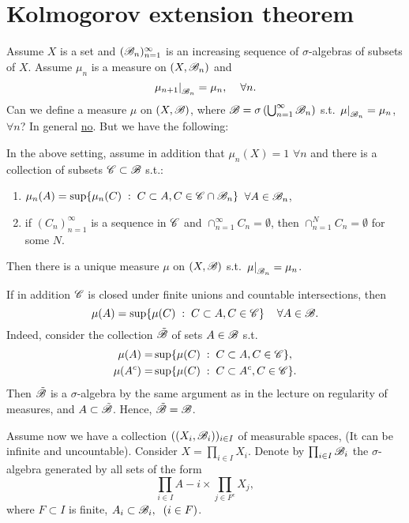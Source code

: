 \section{Kolmogorov extension theorem}
Assume $X$ is a set and $(\mathscr{B}_n)_{n=1}^\infty$ is an increasing sequence of $\sigma$-algebras of subsets of $X$. Assume $\mu_n$ is a measure on $(X,\mathscr{B}_n)$ and 
\[\left. \mu_{n+1} \right|_{\mathscr{B}_n}=\mu_n,\hspace{4mm}\forall n.\]
Can we define a measure $\mu$ on $(X,\mathscr{B})$, where $\mathscr{B}=\sigma\left(\bigcup_{n=1}^\infty \mathscr{B}_n\right)$ s.t. $\left.\mu\right|_{\mathscr{B}_n}=\mu_n$, $\forall n$?
In general \underline{no}. But we have the following:

\begin{theorem}

    In the above setting, assume in addition that $\mu_n(X)=1$ $\forall n$ and there is a collection of subsets $\mathscr{C}\subset \mathscr{B}$ s.t.:
    \begin{enumerate}
        \item $\mu_n(A)=\sup\{\mu_n(C)\hspace{1mm}: \hspace{1mm} C\subset A, C\in \mathscr{C}\cap \mathscr{B}_n \}$ $\forall A\in \mathscr{B}_n$,
        \item if $(C_n)_{n=1}^\infty$ is a sequence in $\mathscr{C}$ and $\cap_{n=1}^\infty C_n=\emptyset$, then $\cap_{n=1}^N C_n =\emptyset$ for some $N$.
    \end{enumerate}
    Then there is a unique measure $\mu$ on $(X,\mathscr{B})$ s.t. $\left.\mu\right|_{\mathscr{B}_n}=\mu_n$.
\end{theorem}

\begin{remark}

    If in addition $\mathscr{C}$ is closed under finite unions and countable intersections, then 
    \[\mu(A)=\sup\{\mu(C)\hspace{1mm}:\hspace{1mm} C\subset A, C\in \mathscr{C}\}\hspace{4mm}\forall A\in\mathscr{B}.\]
    Indeed, consider the collection $\tilde{\mathscr{B}}$ of sets $A\in \mathscr{B}$ s.t. 
    \begin{align*}
        \mu(A)= & \sup\{\mu(C)\hspace{1mm}:\hspace{1mm} C\subset A, C\in \mathscr{C}\},\\
        \mu(A^c)= & \sup\{\mu(C)\hspace{1mm}:\hspace{1mm} C\subset A^c, C\in \mathscr{C}\}.
    \end{align*}
    Then $\tilde{\mathscr{B}}$ is a $\sigma$-algebra by the same argument as in the lecture on regularity of measures, and $A\subset \tilde {\mathscr{B}}$. Hence, $\tilde {\mathscr{B}} = \mathscr{B}$.
\end{remark}

Assume now we have a collection $((X_i,\mathscr{B}_i))_{i\in I}$ of measurable spaces, (It can be infinite and uncountable). Consider $X=\prod_{i\in I} X_i.$
Denote by $\prod_{i\in I} \mathscr{B}_i$ the $\sigma$-algebra generated by all sets of the form \[\prod_{i\in I} A-i \times \prod_{j\in F^c} X_j,\]
where $F\subset I$ is finite, $A_i\subset \mathscr{B}_i,\hspace{2mm} (i\in F)$.

